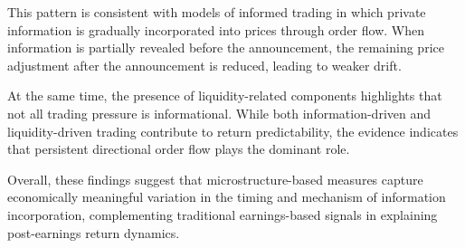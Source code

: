 This pattern is consistent with models of informed trading in which private information is gradually incorporated into prices through order flow. When information is partially revealed before the announcement, the remaining price adjustment after the announcement is reduced, leading to weaker drift.

At the same time, the presence of liquidity-related components highlights that not all trading pressure is informational. While both information-driven and liquidity-driven trading contribute to return predictability, the evidence indicates that persistent directional order flow plays the dominant role.

Overall, these findings suggest that microstructure-based measures capture economically meaningful variation in the timing and mechanism of information incorporation, complementing traditional earnings-based signals in explaining post-earnings return dynamics.

